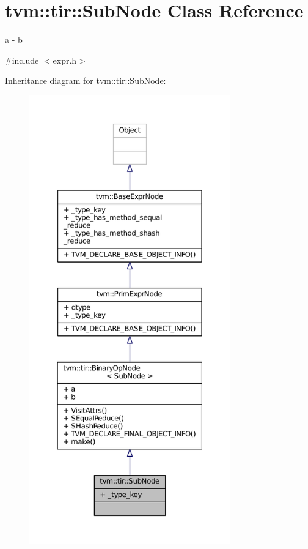 \hypertarget{classtvm_1_1tir_1_1SubNode}{}\section{tvm\+:\+:tir\+:\+:Sub\+Node Class Reference}
\label{classtvm_1_1tir_1_1SubNode}


a -\/ b  




{\ttfamily \#include $<$expr.\+h$>$}



Inheritance diagram for tvm\+:\+:tir\+:\+:Sub\+Node\+:
\nopagebreak
\begin{figure}[H]
\begin{center}
\leavevmode
\includegraphics[height=550pt]{classtvm_1_1tir_1_1SubNode__inherit__graph}
\end{center}
\end{figure}


